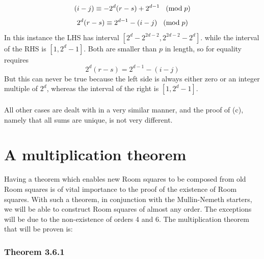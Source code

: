 \documentclass[
  12pt,
  a4paper]{book}
\begin{document}
\[(i-j) \equiv -2^{d}(r-s)+2^{d-1}
\hspace{0.3cm} (\mathrm{mod} \hspace{0.1cm} p)\]
\[2^d(r-s) \equiv 2^{d-1}-(i-j)
\hspace{0.3cm} (\mathrm{mod} \hspace{0.1cm} p)\] In this instance the
LHS has interval \([2^d-2^{2d-2},2^{2d-2}-2^d]\). while the interval of
the RHS is \([1,2^d-1]\). Both are smaller than \(p\) in length, so for
equality requires \[2^d(r-s) = 2^{d-1}-(i-j)\] But this can never be
true because the left side is always either zero or an integer multiple
of \(2^d\), whereas the interval of the right is \([1,2^d-1]\).\\
~\\
All other cases are dealt with in a very similar manner, and the proof
of (c), namely that all sums are unique, is not very different.

\hypertarget{a-multiplication-theorem}{%
\section{A multiplication theorem}\label{a-multiplication-theorem}}

Having a theorem which enables new Room squares to be composed from old
Room squares is of vital importance to the proof of the existence of
Room squares. With such a theorem, in conjunction with the Mullin-Nemeth
starters, we will be able to construct Room squares of almost any order.
The exceptions will be due to the non-existence of orders 4 and 6. The
multiplication theorem that will be proven is:

\hypertarget{theorem-3.6.1}{%
\subsubsection{Theorem 3.6.1}\label{theorem-3.6.1}}
\end{document}
